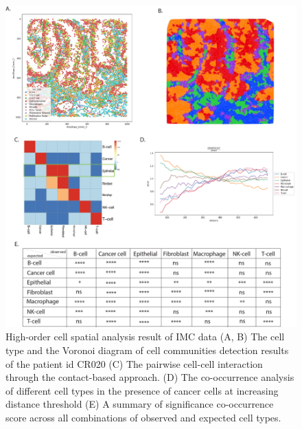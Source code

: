 \begin{figure}
    \centering
    \includegraphics[width=0.8\columnwidth]{Chapter3/Figures/Chap3_figure4.png}
    \caption[High-order cell spatial  analysis result of IMC data.]{High-order cell spatial  analysis result of IMC data (A, B) The cell type and the Voronoi diagram of cell communities detection results of the patient id CR020 (C) The pairwise cell-cell interaction through the contact-based approach. (D) The co-occurrence analysis of different cell types in the presence of cancer cells at increasing distance threshold (E) A summary of significance co-occurrence score across all combinations of observed and expected cell types.}
    \label{fig:colorectal_cancer_IMC}
    
\end{figure}
